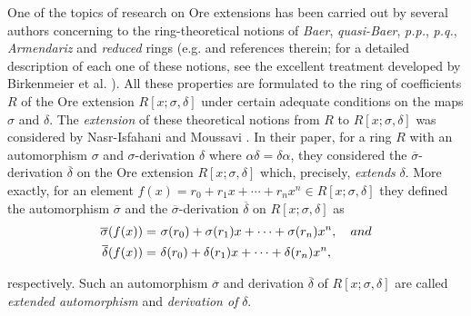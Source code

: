 \documentclass{amsart}
\theoremstyle{definition}
\theoremstyle{remark}
\numberwithin{equation}{section}
\begin{document}
One of the topics of research on Ore extensions has been carried out by several authors concerning to the ring-theoretical notions of {\em Baer}, {\em quasi-Baer}, {\em p.p.}, {\em p.q.}, {\em Armendariz} and {\em reduced} rings (e.g. \cite{Birkenmeieretal2001b, Hashemietal2003, HashemiMoussavi2005, HongKimKwak2000, HongKimKwak2003, Huhetal2002, Kaplansky1968, Krempa1996, LeeWong2003, Matczuk2004} and references therein; for a detailed description of each one of these notions, see the excellent treatment developed by Birkenmeier et al. \cite{BirkenmeierParkRizvi2013}). All these properties are formulated to the ring of coefficients $R$ of the Ore extension $R[x; \sigma, \delta]$ under certain adequate conditions on the maps $\sigma$ and $\delta$. The {\em extension} of these theoretical notions from $R$ to $R[x; \sigma, \delta]$ was considered by Nasr-Isfahani and Moussavi \cite{NasrMoussavi2008}. In their paper, for a ring $R$ with an automorphism $\sigma$ and $\sigma$-derivation $\delta$ where $\alpha \delta = \delta \alpha$, they considered the $\overline{\sigma}$-derivation $\overline{\delta}$ on the Ore extension $R[x; \sigma, \delta]$ which, precisely, {\em extends} $\delta$. More exactly, for an element $f(x) = r_0 + r_1 x + \dotsb + r_nx^n \in R[x; \sigma, \delta]$ they defined the automorphism $\overline{\sigma}$ and the $\overline{\sigma}$-derivation $\overline{\delta}$ on $R[x; \sigma, \delta]$ as
\begin{align*}
    \overline{\sigma}(f(x)) = &\ \sigma(r_0) + \sigma(r_1) x + \dotsb + \sigma(r_n)x^n, \quad {\rm and} \\
     \overline{\delta}(f(x)) = &\ \delta(r_0) + \delta(r_1) x + \dotsb + \delta(r_n)x^n, 
\end{align*}

respectively. Such an automorphism $\overline{\sigma}$ and derivation $\overline{\delta}$ of $R[x; \sigma, \delta]$ are called {\em extended automorphism} and {\em derivation of} $\delta$.
\end{document}
